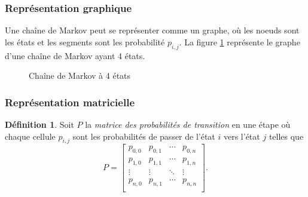 \documentclass[11pt]{article}
\makeatletter
\theoremstyle{remark}
\theoremstyle{definition}
\newtheorem*{@definition}{Définition}
\newenvironment{definition}{%
	\begin{@definition}%
}{%
	\end{@definition}%
	\setcounter{property}{0}%
}
\makeatother
\begin{document}
\subsubsection{Représentation graphique}
Une chaîne de Markov peut se représenter comme un graphe, où les noeuds sont
les états et les segments sont les probabilité $p_{i,j}$. La figure
\ref{fig:markov_graph} représente le graphe d'une chaîne de Markov ayant 4
états.

\begin{figure}[H]
	\centering
	
	\caption{Chaîne de Markov à 4 états}
	\label{fig:markov_graph}
\end{figure}

\subsubsection{Représentation matricielle}
\begin{definition}
	Soit $P$ la \textit{matrice des probabilités de transition} en une étape où
	chaque cellule $p_{i,j}$ sont les probabilités de passer de l'état $i$ vers
	l'état $j$ telles que
	\begin{equation*}
		P=\left[
			\begin{matrix}
				p_{0,0} & p_{0,1} & \cdots & p_{0,n}\\
				p_{1,0} & p_{1,1} & \cdots & p_{1,n}\\
				\vdots  & \vdots  & \ddots & \vdots \\
				p_{n,0} & p_{n,1} & \cdots & p_{n,n}\\
			\end{matrix}
		\right].
	\end{equation*}
\end{definition}
\end{document}
